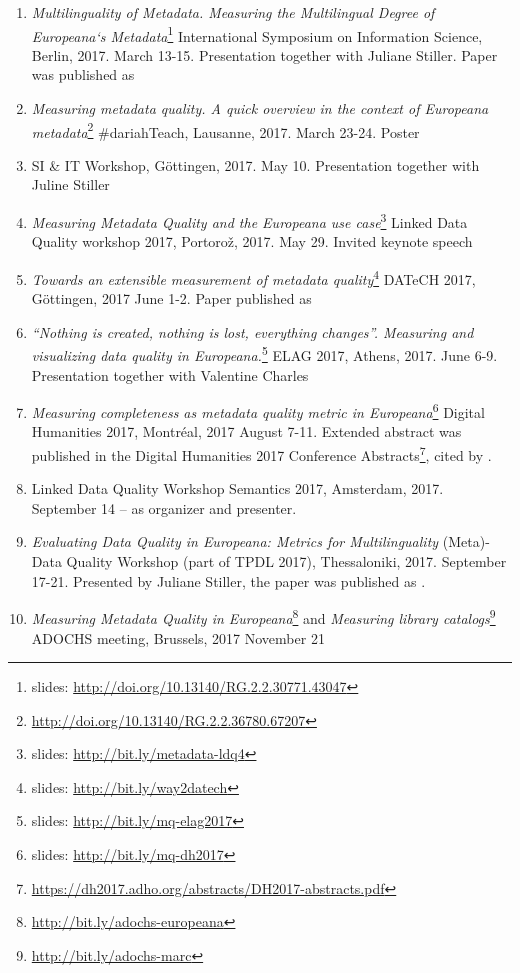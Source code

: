 \begin{enumerate}
  \setlength{\parskip}{0pt}
  \setlength{\itemsep}{0pt plus 1pt}
\item \emph{Multilinguality of Metadata. Measuring the Multilingual Degree of Europeana‘s Metadata}\footnote{slides: \url{http://doi.org/10.13140/RG.2.2.30771.43047}} International Symposium on Information Science, Berlin, 2017. March 13-15. Presentation together with Juliane Stiller. Paper was published as \cite{stiller-kiraly2017}
\item \emph{Measuring metadata quality. A quick overview in the context of Europeana metadata}\footnote{\url{http://doi.org/10.13140/RG.2.2.36780.67207}} \#dariahTeach, Lausanne, 2017. March 23-24. Poster
\item SI \& IT Workshop, Göttingen, 2017. May 10. Presentation together with Juline Stiller
\item \emph{Measuring Metadata Quality and the Europeana use case}\footnote{slides: \url{http://bit.ly/metadata-ldq4}} Linked Data Quality workshop 2017, Portorož, 2017. May 29. Invited keynote speech
\item \emph{Towards an extensible measurement of metadata quality}\footnote{slides: \url{http://bit.ly/way2datech}} DATeCH 2017, Göttingen, 2017 June 1-2. Paper published as \cite{kiraly2017}
\item \emph{``Nothing is created, nothing is lost, everything changes''. Measuring and visualizing data quality in Europeana.}\footnote{slides: \url{http://bit.ly/mq-elag2017}} ELAG 2017, Athens, 2017. June 6-9. Presentation together with Valentine Charles
\item \emph{Measuring completeness as metadata quality metric in Europeana}\footnote{slides: \url{http://bit.ly/mq-dh2017}} Digital Humanities 2017, Montréal, 2017 August 7-11. Extended abstract was published in the Digital Humanities 2017 Conference Abstracts\footnote{\url{https://dh2017.adho.org/abstracts/DH2017-abstracts.pdf}}, cited by \cite{khan2018}.
\item Linked Data Quality Workshop Semantics 2017, Amsterdam, 2017. September 14 -- as organizer and presenter.
\item \emph{Evaluating Data Quality in Europeana: Metrics for Multilinguality} (Meta)-Data Quality Workshop (part of TPDL 2017), Thessaloniki, 2017. September 17-21. Presented by Juliane Stiller, the paper was published as \cite{charles2017}.
\item \emph{Measuring Metadata Quality in Europeana}\footnote{\url{http://bit.ly/adochs-europeana}} and \emph{Measuring library catalogs}\footnote{\url{http://bit.ly/adochs-marc}} ADOCHS meeting, Brussels, 2017 November 21

\end{enumerate}
